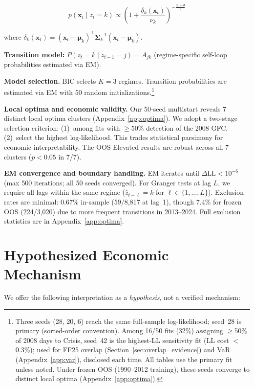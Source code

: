 \documentclass[sigconf,anonymous]{acmart}
\begin{document}
\begin{equation}
p(\mathbf{x}_t \mid z_t = k) \propto \left(1 + \frac{\delta_k(\mathbf{x}_t)}{\nu_k}\right)^{-\frac{\nu_k+d}{2}}
\end{equation}

where $\delta_k(\mathbf{x}_t) = (\mathbf{x}_t - \boldsymbol{\mu}_k)^\top\boldsymbol{\Sigma}_k^{-1}(\mathbf{x}_t - \boldsymbol{\mu}_k)$.

\textbf{Transition model:} $P(z_t = k \mid z_{t-1} = j) = A_{jk}$ (regime-specific self-loop probabilities estimated via EM).

\textbf{Model selection.} BIC selects $K=3$ regimes. Transition
probabilities are estimated via EM with 50 random
initializations.\footnote{Three seeds (28, 20, 6) reach the same full-sample
log-likelihood; seed~28 is primary (sorted-order convention).
Among 16/50 fits (32\%) assigning $\geq$50\% of 2008 days to Crisis,
seed~42 is the highest-LL sensitivity fit (LL cost $<$0.3\%); used for
FF25 overlap (Section~\ref{sec:overlap_evidence}) and VaR
(Appendix~\ref{app:var}), disclosed each time. All tables use the primary
fit unless noted. Under frozen OOS (1990--2012 training), these seeds
converge to distinct local optima (Appendix~\ref{app:optima}).}

\textbf{Local optima and economic validity.}
Our 50-seed multistart reveals 7 distinct local optima clusters (Appendix~\ref{app:optima}).
We adopt a two-stage selection criterion: (1)~among fits with $\geq$50\% detection
of the 2008 GFC, (2)~select the highest log-likelihood. This trades statistical
parsimony for economic interpretability. The OOS Elevated results are robust
across all 7 clusters ($p < 0.05$ in 7/7).

\textbf{EM convergence and boundary handling.}
EM iterates until $\Delta\text{LL} < 10^{-6}$ (max 500 iterations; all 50 seeds converged).
For Granger tests at lag $L$, we require all lags within the same regime ($\hat{z}_{t-\ell} = k$ for
$\ell \in \{1, \ldots, L\}$). Exclusion rates are minimal: 0.67\%
in-sample (59/8,817 at lag~1), though 7.4\% for frozen OOS (224/3,020)
due to more frequent transitions in 2013--2024. Full exclusion statistics
are in Appendix~\ref{app:optima}.

\section{Hypothesized Economic Mechanism}
\label{app:mechanism}

We offer the following interpretation as a \emph{hypothesis}, not a verified mechanism:
\end{document}
